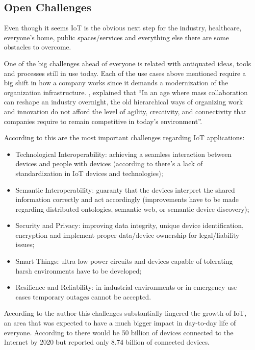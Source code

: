 \subsection{Open Challenges}
\label{subsec:stateofart:arch:challenges}

Even though it seems \gls{IoT} is the obvious next step for the industry, healthcare, everyone's home, public spaces/services and everything else there are some obstacles to overcome.

One of the big challenges ahead of everyone is related with antiquated ideas, tools and processes still in use today.
Each of the use cases above mentioned require a big shift in how a company works since it demands a modernization of the organization infrastructure.
\cite{tapscott2006wikinomics}, explained that ``In an age where mass collaboration can reshape an industry overnight, the old hierarchical ways of organizing work and innovation do not afford the level of agility, creativity, and connectivity that companies require to remain competitive in today's environment''.

According to \cite{7073822} this are the most important challenges regarding \gls{IoT} applications:

\begin{itemize}
    \item Technological Interoperability: achieving a seamless interaction between devices and people with devices (according to \cite{al2016iot} there's a lack of standardization in \gls{IoT} devices and technologies);
    \item Semantic Interoperability: guaranty that the devices interpret the shared information
correctly and act accordingly (improvements have to be made regarding distributed ontologies, semantic web, or semantic device discovery);
    \item Security and Privacy: improving data integrity, unique device identification, encryption and implement proper data/device ownership for legal/liability issues;
    \item Smart Things: ultra low power circuits and devices capable of tolerating harsh environments have to be developed;
    \item Resilience and Reliability: in industrial environments or in emergency use cases temporary outages cannot be accepted.
\end{itemize}

According to the author this challenges substantially lingered the growth of \gls{IoT}, an area that was expected to have a much bigger impact in day-to-day life of everyone. According to \cite{iot-cisco-prediction} there would be 50 billion of devices connected to the Internet by 2020 but \cite{statista-number-devices} reported only 8.74 billion of connected devices.

